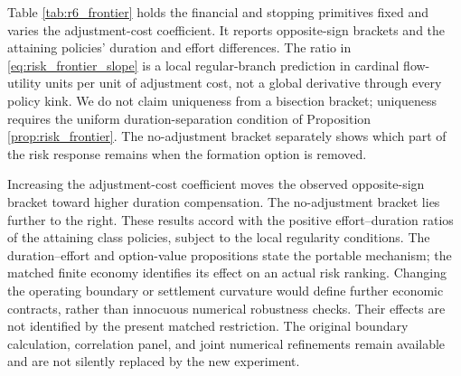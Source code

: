 Table \ref{tab:r6_frontier} holds the financial and stopping primitives fixed and varies the adjustment-cost coefficient. It reports opposite-sign brackets and the attaining policies' duration and effort differences. The ratio in \eqref{eq:risk_frontier_slope} is a local regular-branch prediction in cardinal flow-utility units per unit of adjustment cost, not a global derivative through every policy kink. We do not claim uniqueness from a bisection bracket; uniqueness requires the uniform duration-separation condition of Proposition \ref{prop:risk_frontier}. The no-adjustment bracket separately shows which part of the risk response remains when the formation option is removed.

Increasing the adjustment-cost coefficient moves the observed opposite-sign bracket toward higher duration compensation. The no-adjustment bracket lies further to the right. These results accord with the positive effort--duration ratios of the attaining class policies, subject to the local regularity conditions. The duration--effort and option-value propositions state the portable mechanism; the matched finite economy identifies its effect on an actual risk ranking. Changing the operating boundary or settlement curvature would define further economic contracts, rather than innocuous numerical robustness checks. Their effects are not identified by the present matched restriction. The original boundary calculation, correlation panel, and joint numerical refinements remain available and are not silently replaced by the new experiment.
